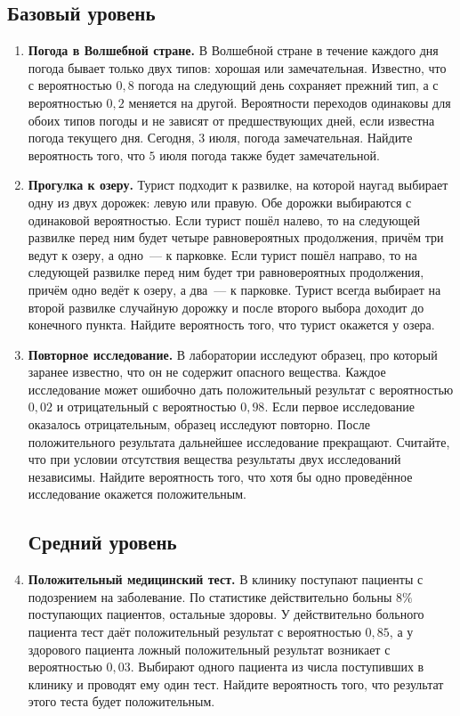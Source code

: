 \documentclass[a4paper,12pt]{article}
\begin{document}
\subsection*{Базовый уровень}
\begin{enumerate}[label=\textbf{\arabic*.},wide=0pt]
\item \textbf{Погода в Волшебной стране.} В Волшебной стране в течение каждого дня погода бывает только двух типов: хорошая или замечательная. Известно, что с вероятностью $0{,}8$ погода на следующий день сохраняет прежний тип, а с вероятностью $0{,}2$ меняется на другой. Вероятности переходов одинаковы для обоих типов погоды и не зависят от предшествующих дней, если известна погода текущего дня. Сегодня, $3$ июля, погода замечательная. Найдите вероятность того, что $5$ июля погода также будет замечательной.

\item \textbf{Прогулка к озеру.} Турист подходит к развилке, на которой наугад выбирает одну из двух дорожек: левую или правую. Обе дорожки выбираются с одинаковой вероятностью. Если турист пошёл налево, то на следующей развилке перед ним будет четыре равновероятных продолжения, причём три ведут к озеру, а одно~--- к парковке. Если турист пошёл направо, то на следующей развилке перед ним будет три равновероятных продолжения, причём одно ведёт к озеру, а два~--- к парковке. Турист всегда выбирает на второй развилке случайную дорожку и после второго выбора доходит до конечного пункта. Найдите вероятность того, что турист окажется у озера.

\item \textbf{Повторное исследование.} В лаборатории исследуют образец, про который заранее известно, что он не содержит опасного вещества. Каждое исследование может ошибочно дать положительный результат с вероятностью $0{,}02$ и отрицательный с вероятностью $0{,}98$. Если первое исследование оказалось отрицательным, образец исследуют повторно. После положительного результата дальнейшее исследование прекращают. Считайте, что при условии отсутствия вещества результаты двух исследований независимы. Найдите вероятность того, что хотя бы одно проведённое исследование окажется положительным.

\subsection*{Средний уровень}
\item \textbf{Положительный медицинский тест.} В клинику поступают пациенты с подозрением на заболевание. По статистике действительно больны $8\%$ поступающих пациентов, остальные здоровы. У действительно больного пациента тест даёт положительный результат с вероятностью $0{,}85$, а у здорового пациента ложный положительный результат возникает с вероятностью $0{,}03$. Выбирают одного пациента из числа поступивших в клинику и проводят ему один тест. Найдите вероятность того, что результат этого теста будет положительным.


\end{enumerate}
\end{document}
